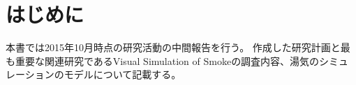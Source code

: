 \section{はじめに}
本書では2015年10月時点の研究活動の中間報告を行う。
作成した研究計画と最も重要な関連研究であるVisual Simulation of Smoke\cite{Fedkiw2001}の調査内容、湯気のシミュレーションのモデルについて記載する。